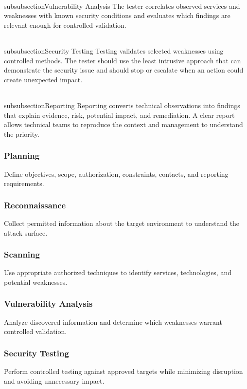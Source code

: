 \documentclass[11pt,a4paper]{article}
\begin{document}
\\subsubsection{Vulnerability Analysis}
The tester correlates observed services and weaknesses with known security conditions and evaluates which findings are relevant enough for controlled validation.

\\subsubsection{Security Testing}
Testing validates selected weaknesses using controlled methods. The tester should use the least intrusive approach that can demonstrate the security issue and should stop or escalate when an action could create unexpected impact.

\\subsubsection{Reporting}
Reporting converts technical observations into findings that explain evidence, risk, potential impact, and remediation. A clear report allows technical teams to reproduce the context and management to understand the priority.

\subsubsection{Planning}
Define objectives, scope, authorization, constraints, contacts, and reporting requirements.

\subsubsection{Reconnaissance}
Collect permitted information about the target environment to understand the attack surface.

\subsubsection{Scanning}
Use appropriate authorized techniques to identify services, technologies, and potential weaknesses.

\subsubsection{Vulnerability Analysis}
Analyze discovered information and determine which weaknesses warrant controlled validation.

\subsubsection{Security Testing}
Perform controlled testing against approved targets while minimizing disruption and avoiding unnecessary impact.
\end{document}
